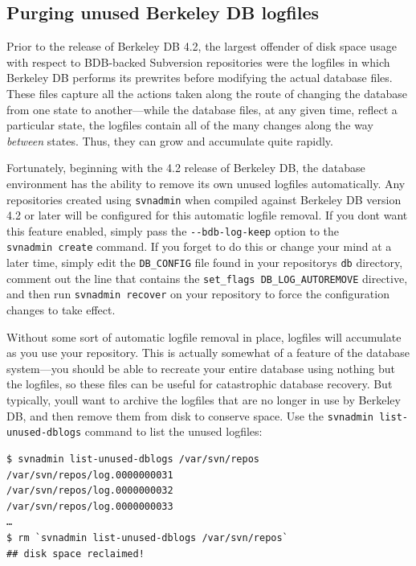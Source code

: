 \subsection{Purging unused Berkeley DB
logfiles}\label{svn.berkeleydb.maintenance.bdblogs}

Prior to the release of Berkeley DB 4.2, the largest offender of disk
space usage with respect to BDB-backed Subversion repositories were the
logfiles in which Berkeley DB performs its prewrites before modifying
the actual database files. These files capture all the actions taken
along the route of changing the database from one state to
another---while the database files, at any given time, reflect a
particular state, the logfiles contain all of the many changes along the
way \emph{between} states. Thus, they can grow and accumulate quite
rapidly.

Fortunately, beginning with the 4.2 release of Berkeley DB, the database
environment has the ability to remove its own unused logfiles
automatically. Any repositories created using \texttt{svnadmin} when
compiled against Berkeley DB version 4.2 or later will be configured for
this automatic logfile removal. If you don\textquotesingle t want this
feature enabled, simply pass the \texttt{-\/-bdb-log-keep} option to the
\texttt{svnadmin\ create} command. If you forget to do this or change
your mind at a later time, simply edit the \texttt{DB\_CONFIG} file
found in your repository\textquotesingle s \texttt{db} directory,
comment out the line that contains the
\texttt{set\_flags\ DB\_LOG\_AUTOREMOVE} directive, and then run
\texttt{svnadmin\ recover} on your repository to force the configuration
changes to take effect.

Without some sort of automatic logfile removal in place, logfiles will
accumulate as you use your repository. This is actually somewhat of a
feature of the database system---you should be able to recreate your
entire database using nothing but the logfiles, so these files can be
useful for catastrophic database recovery. But typically,
you\textquotesingle ll want to archive the logfiles that are no longer
in use by Berkeley DB, and then remove them from disk to conserve space.
Use the \texttt{svnadmin\ list-unused-dblogs} command to list the unused
logfiles:

\begin{verbatim}
$ svnadmin list-unused-dblogs /var/svn/repos
/var/svn/repos/log.0000000031
/var/svn/repos/log.0000000032
/var/svn/repos/log.0000000033
…
$ rm `svnadmin list-unused-dblogs /var/svn/repos`
## disk space reclaimed!
\end{verbatim}


